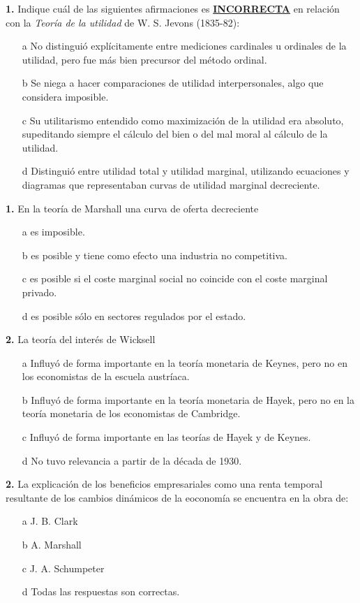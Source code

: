 \documentclass{nuevotema}
\begin{document}
\textbf{1.} Indique cuál de las siguientes afirmaciones es \underline{\textbf{INCORRECTA}} en relación con la \textit{Teoría de la utilidad} de W. S. Jevons (1835-82):

\begin{itemize}
	\item[a] No distinguió explícitamente entre mediciones cardinales u ordinales de la utilidad, pero fue más bien precursor del método ordinal.
	\item[b] Se niega a hacer comparaciones de utilidad interpersonales, algo que considera imposible.
	\item[c] Su utilitarismo entendido como maximización de la utilidad era absoluto, supeditando siempre el cálculo del bien o del mal moral al cálculo de la utilidad.
	\item[d] Distinguió entre utilidad total y utilidad marginal, utilizando ecuaciones y diagramas que representaban curvas de utilidad marginal decreciente.
\end{itemize}

\textbf{1.} En la teoría de Marshall una curva de oferta decreciente
\begin{itemize}
	\item[a] es imposible.
	\item[b] es posible y tiene como efecto una industria no competitiva.
	\item[c] es posible si el coste marginal social no coincide con el coste marginal privado.
	\item[d] es posible sólo en sectores regulados por el estado.
\end{itemize}

\textbf{2.} La teoría del interés de Wicksell
\begin{itemize}
	\item[a] Influyó de forma importante en la teoría monetaria de Keynes, pero no en los economistas de la escuela austríaca.
	\item[b] Influyó de forma importante en la teoría monetaria de Hayek, pero no en la teoría monetaria de los economistas de Cambridge.
	\item[c] Influyó de forma importante en las teorías de Hayek y de Keynes.
	\item[d] No tuvo relevancia a partir de la década de 1930.
\end{itemize}

\textbf{2.} La explicación de los beneficios empresariales como una renta temporal resultante de los cambios dinámicos de la eoconomía se encuentra en la obra de:
\begin{itemize}
	\item[a] J. B. Clark
	\item[b] A. Marshall
	\item[c] J. A. Schumpeter
	\item[d] Todas las respuestas son correctas.
\end{itemize}
\end{document}
